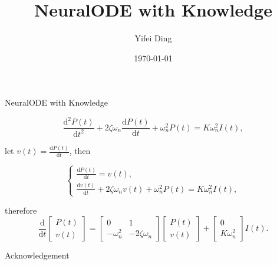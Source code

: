 \documentclass[12pt,aspectratio=169]{beamer}
\title{NeuralODE with Knowledge}
\subtitle{}
\author{Yifei Ding}
\date{\today}
\begin{document}
\maketitle
\footnotesize

\begin{frame}{NeuralODE with Knowledge}

  \[
    \frac{\mathrm{d}^2P(t)}{\mathrm{d}t^2}+2\zeta\omega_n
    \frac{\mathrm{d}P(t)}{\mathrm{d}t}+\omega_n^2P(t)=K\omega_n^2I(t),
  \]

  let $\displaystyle v(t)=\frac{\mathrm{d}P(t)}{\mathrm{d}t}$, then

  \[
    \begin{cases}
      \displaystyle\frac{\mathrm{d}P(t)}{\mathrm{d}t}=v(t),\\
      \displaystyle\frac{\mathrm{d}v(t)}{\mathrm{d}t}+2\zeta\omega_n v(t)+\omega_n^2 P(t)=K\omega_n^2 I(t),
    \end{cases}
  \]

  therefore 
  \[
    \frac{\mathrm{d}}{\mathrm{d}t}\left[\begin{matrix}P(t)\\ v(t)\end{matrix}\right]
      = \left[\begin{matrix}0 & 1 \\ -\omega_n^2 & -2\zeta\omega_n \end{matrix}\right] \left[\begin{matrix}P(t)\\ v(t)\end{matrix}\right]
      + \left[\begin{matrix}0 \\ K\omega_n^2\end{matrix}\right] I(t).
  \]

\end{frame}

\begin{frame}{Acknowledgement}
  \begin{center}
    \textcolor{gray}{\Huge{\centerline{}}}
  \end{center}
\end{frame}
\end{document}
